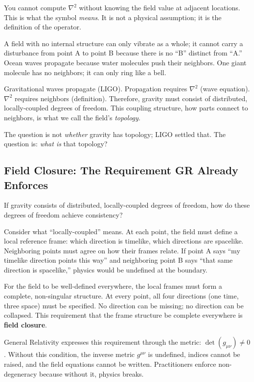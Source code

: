 \documentclass[aps,prd,preprint,superscriptaddress,showpacs,preprintnumbers,amsmath,amssymb,nofootinbib]{revtex4-2}
\begin{document}
You cannot compute $\nabla^2$ without knowing the field value at adjacent locations. This is what the symbol \emph{means}. It is not a physical assumption; it is the definition of the operator.

A field with no internal structure can only vibrate as a whole; it cannot carry a disturbance from point A to point B because there is no ``B'' distinct from ``A.'' Ocean waves propagate because water molecules push their neighbors. One giant molecule has no neighbors; it can only ring like a bell.

Gravitational waves propagate (LIGO). Propagation requires $\nabla^2$ (wave equation). $\nabla^2$ requires neighbors (definition). Therefore, gravity must consist of distributed, locally-coupled degrees of freedom. This coupling structure, how parts connect to neighbors, is what we call the field's \emph{topology}.

The question is not \emph{whether} gravity has topology; LIGO settled that. The question is: \emph{what is} that topology?

\subsection{Field Closure: The Requirement GR Already Enforces}
\label{subsec:closure}

If gravity consists of distributed, locally-coupled degrees of freedom, how do these degrees of freedom achieve consistency?

Consider what ``locally-coupled'' means. At each point, the field must define a local reference frame: which direction is timelike, which directions are spacelike. Neighboring points must agree on how their frames relate. If point A says ``my timelike direction points this way'' and neighboring point B says ``that same direction is spacelike,'' physics would be undefined at the boundary.

For the field to be well-defined everywhere, the local frames must form a complete, non-singular structure. At every point, all four directions (one time, three space) must be specified. No direction can be missing; no direction can be collapsed. This requirement that the frame structure be complete everywhere is \textbf{field closure}.

General Relativity expresses this requirement through the metric: $\det(g_{\mu\nu}) \neq 0$. Without this condition, the inverse metric $g^{\mu\nu}$ is undefined, indices cannot be raised, and the field equations cannot be written. Practitioners enforce non-degeneracy because without it, physics breaks.
\end{document}

